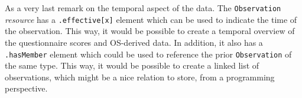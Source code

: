 \noindent
As a very last remark on the temporal aspect of the data. The \texttt{Observation} \emph{resource} has a \texttt{.effective[x]} element which can be used to indicate the time of the observation. This way, it would be possible to create a temporal overview of the questionnaire scores and OS-derived data. In addition, it also has a \texttt{.hasMember} element which could be used to reference the prior \texttt{Observation} of the same type. This way, it would be possible to create a linked list of observations, which might be a nice relation to store, from a programming perspective.

